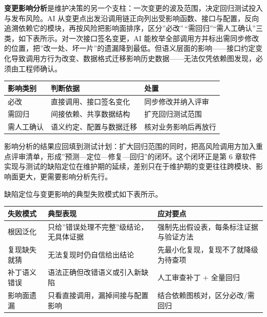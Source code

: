 \documentclass[
]{ctexbook}
\newcounter{none}
\begin{document}
\textbf{变更影响分析}是维护决策的另一个支柱：一次变更的波及范围，决定回归测试投入与发布风险。AI
从变更点出发沿调用链正向列出受影响函数、接口与配置，反向追溯依赖它的模块，再按风险把影响面排序，区分''必改''\,``需回归''``需人工确认''三类，如下表所示。对一次接口签名变更，AI
能枚举全部调用方并标出需同步修改的位置，把''改一处、坏一片''的遗漏降到最低。但语义层面的影响------接口约定变化导致调用方行为改变、数据格式迁移影响历史数据------无法仅凭依赖图发现，必须由工程师确认。

{\def\LTcaptype{none} %
\begin{longtable}[]{@{}lll@{}}
\toprule\noalign{}
影响类别 & 判断依据 & 处置 \\
\midrule\noalign{}
\endhead
\bottomrule\noalign{}
\endlastfoot
必改 & 直接调用、接口签名变化 & 同步修改并纳入评审 \\
需回归 & 间接依赖、共享数据结构 & 扩充回归测试范围 \\
需人工确认 & 语义约定、配置与数据迁移 & 核对业务影响后再放行 \\
\end{longtable}
}

影响分析的结果应回填到测试计划：扩大回归范围的同时，把高风险调用方加入重点评审清单，形成''预测---定位---修复---回归''的闭环。这个闭环正是第
6
章软件实现与测试的缺陷定位在维护期的延续，差别只在于维护期的变更往往跨模块、影响面更大，更需要影响分析先行。

缺陷定位与变更影响的典型失败模式如下表所示。

{\def\LTcaptype{none} %
\begin{longtable}[]{@{}
  >{\raggedright\arraybackslash}p{}
  >{\raggedright\arraybackslash}p{}
  >{\raggedright\arraybackslash}p{}@{}}
\toprule\noalign{}
\begin{minipage}[b]{\linewidth}\raggedright
失败模式
\end{minipage} & \begin{minipage}[b]{\linewidth}\raggedright
典型表现
\end{minipage} & \begin{minipage}[b]{\linewidth}\raggedright
应对要点
\end{minipage} \\
\midrule\noalign{}
\endhead
\bottomrule\noalign{}
\endlastfoot
根因泛化 & 只给''错误处理不完整''级结论，无具体证据 &
强制先出假设表，每条标注证据与验证方法 \\
复现缺失就猜 & 无法复现时仍自信给出结论 &
先最小化复现，复现不了就降级为待查项 \\
补丁语义错误 & 语法正确但改错语义或引入新缺陷 & 人工审查补丁 +
全量回归 \\
影响面遗漏 & 只看直接调用，漏掉间接与配置影响 &
结合依赖图核对，区分必改/需回归 \\
\end{longtable}
}
\end{document}
